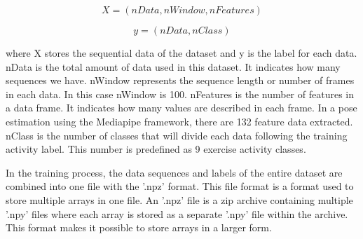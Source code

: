 \begin{equation}
	\label{eq: pers.5}
	X = (nData, nWindow, nFeatures)
\end{equation}

\begin{equation}
	\label{eq: pers.6}
	y = (nData, nClass)
\end{equation}

where X stores the sequential data of the dataset and y is the label for each data. nData is the total amount of data used in this dataset. It indicates how many sequences we have. nWindow represents the sequence length or number of frames in each data. In this case nWindow is 100. nFeatures is the number of features in a data frame. It indicates how many values are described in each frame. In a pose estimation using the Mediapipe framework, there are 132 feature data extracted. nClass is the number of classes that will divide each data following the training activity label. This number is predefined as 9 exercise activity classes.

In the training process, the data sequences and labels of the entire dataset are combined into one file with the '.npz' format. This file format is a format used to store multiple arrays in one file. An '.npz' file is a zip archive containing multiple '.npy' files where each array is stored as a separate '.npy' file within the archive. This format makes it possible to store arrays in a larger form.


